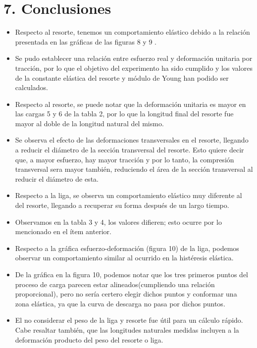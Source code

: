 \section{7. Conclusiones}
\begin{itemize}
  \item Respecto al resorte, tenemos un comportamiento elástico debido a la relación presentada en las gráficas de las figuras 8 y 9 .
  \item Se pudo establecer una relación entre esfuerzo real y deformación unitaria por tracción, por lo que el objetivo del experimento ha sido cumplido y los valores de la constante elástica del resorte y módulo de Young han podido ser calculados.
  \item Respecto al resorte, se puede notar que la deformación unitaria es mayor en las cargas 5 y 6 de la tabla 2, por lo que la longitud final del resorte fue mayor al doble de la longitud natural del mismo.
  \item Se observa el efecto de las deformaciones transversales en el resorte, llegando a reducir el diámetro de la sección transversal del resorte. Esto quiere decir que, a mayor esfuerzo, hay mayor tracción y por lo tanto, la compresión transversal sera mayor también, reduciendo el área de la sección transversal al reducir el diámetro de esta.
  \item Respecto a la liga, se observa un comportamiento elástico muy diferente al del resorte, llegando a recuperar su forma después de un largo tiempo.
  \item Observamos en la tabla 3 y 4, los valores difieren; esto ocurre por lo mencionado en el ítem anterior.
  \item Respecto a la gráfica esfuerzo-deformación (figura 10) de la liga, podemos observar un comportamiento similar al ocurrido en la histéresis elástica.
  \item De la gráfica en la figura 10, podemos notar que los tres primeros puntos del proceso de carga parecen estar alineados(cumpliendo una relación proporcional), pero no sería certero elegir dichos puntos y conformar una zona elástica, ya que la curva de descarga no pasa por dichos puntos.
  \item El no considerar el peso de la liga y resorte fue útil para un cálculo rápido. Cabe resaltar también, que las longitudes naturales medidas incluyen a la deformación producto del peso del resorte o liga.
\end{itemize}
